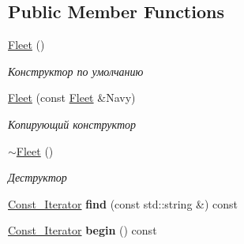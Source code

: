 \subsection*{Public Member Functions}
\begin{DoxyCompactItemize}
\item 
\mbox{\label{class_aircraft_carrier_group_1_1_fleet_a2ef466460d466153291eb4a4b62990a2}} 
\mbox{\hyperlink{class_aircraft_carrier_group_1_1_fleet_a2ef466460d466153291eb4a4b62990a2}{Fleet}} ()
\begin{DoxyCompactList}\small\item\em Конструктор по умолчанию \end{DoxyCompactList}\item 
\mbox{\hyperlink{class_aircraft_carrier_group_1_1_fleet_afd8802987a6ff91b25cba30a140cc57a}{Fleet}} (const \mbox{\hyperlink{class_aircraft_carrier_group_1_1_fleet}{Fleet}} \&Navy)
\begin{DoxyCompactList}\small\item\em Копирующий конструктор \end{DoxyCompactList}\item 
\mbox{\label{class_aircraft_carrier_group_1_1_fleet_a8468d2f43ed82a39a8e885168626a5dd}} 
\mbox{\hyperlink{class_aircraft_carrier_group_1_1_fleet_a8468d2f43ed82a39a8e885168626a5dd}{$\sim$\+Fleet}} ()
\begin{DoxyCompactList}\small\item\em Деструктор \end{DoxyCompactList}\item 
\mbox{\label{class_aircraft_carrier_group_1_1_fleet_aac2a2f25ae1967ba39ab3334da38bb5c}} 
\mbox{\hyperlink{class_aircraft_carrier_group_1_1_const_fleet_it}{Const\+\_\+\+Iterator}} {\bfseries find} (const std\+::string \&) const
\item 
\mbox{\label{class_aircraft_carrier_group_1_1_fleet_a239804d29253792f1abbc011ee752d63}} 
\mbox{\hyperlink{class_aircraft_carrier_group_1_1_const_fleet_it}{Const\+\_\+\+Iterator}} {\bfseries begin} () const
\item 
\mbox{\label{class_aircraft_carrier_group_1_1_fleet_ae0f445f9309b45e53a70cde913ab1192}} 

\end{DoxyCompactItemize}
